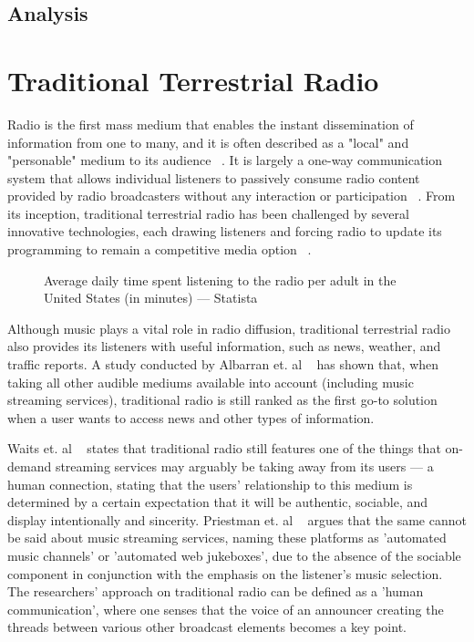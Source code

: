 \subsection{Analysis}


\section{Traditional Terrestrial Radio}
Radio is the first mass medium that enables the instant dissemination of information from one to many, and it is often described as a "local" and "personable" medium to its audience ~\cite{Ren2004}. It is largely a one-way communication system that allows individual listeners to passively consume radio content provided by radio broadcasters without any interaction or participation ~\cite{Gazi2011}. From its inception, traditional terrestrial radio has been challenged by several innovative technologies, each drawing listeners and forcing radio to update its programming to remain a competitive media option ~\cite{Albarran2007}. 

\begin{figure}
 \centering
\caption{Average daily time spent listening to the radio per adult in the United States (in minutes) —  Statista}
\label{fig:test_env}
\end{figure}


Although music plays a vital role in radio diffusion, traditional terrestrial radio also provides its listeners with useful information, such as news, weather, and traffic reports. A study conducted by Albarran et. al ~\cite{Albarran2007} has shown that, when taking all other audible mediums available into account (including music streaming services), traditional radio is still ranked as the first go-to solution when a user wants to access news and other types of information. 


Waits et. al ~\cite{Waits2007} states that traditional radio still features one of the things that on-demand streaming services may arguably be taking away from its users — a human connection, stating that the users' relationship to this medium is determined by a certain expectation that it will be authentic, sociable, and display intentionally and sincerity. Priestman et. al ~\cite{Priestman2005} argues that the same cannot be said about music streaming services, naming these platforms as 'automated music channels' or 'automated web jukeboxes', due to the absence of the sociable component in conjunction with the emphasis on the listener's music selection. The researchers' approach on traditional radio can be defined as a 'human communication', where one senses that the voice of an announcer creating the threads between various other broadcast elements becomes a key point. 

